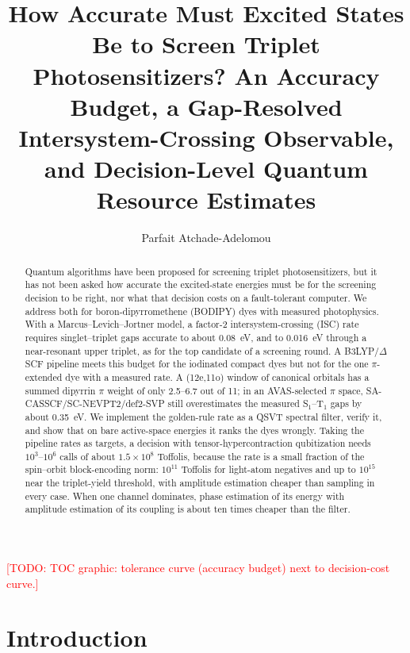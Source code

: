 \documentclass[journal=jctcce,manuscript=article,layout=twocolumn]{achemso}
\author{Parfait Atchade-Adelomou}
\affiliation[MIT Media Lab]{City Science, MIT Media Lab, Massachusetts Institute of Technology,
  75 Amherst St, Cambridge, MA 02139, USA}
\title[Accuracy budget and quantum cost of photosensitizer screening]
{How Accurate Must Excited States Be to Screen Triplet Photosensitizers? An Accuracy Budget, a
 Gap-Resolved Intersystem-Crossing Observable, and Decision-Level Quantum Resource Estimates}
\newcommand{\todo}[1]{\textcolor{red}{[TODO: #1]}}
\begin{document}
\begin{tocentry}
\todo{TOC graphic: tolerance curve (accuracy budget) next to decision-cost curve.}
\end{tocentry}

\begin{abstract}
Quantum algorithms have been proposed for screening triplet photosensitizers, but it has not been
asked how accurate the excited-state energies must be for the screening decision to be right, nor what
that decision costs on a fault-tolerant computer. We address both for boron-dipyrromethene (BODIPY)
dyes with measured photophysics. With a Marcus--Levich--Jortner model, a factor-2 intersystem-crossing
(ISC) rate requires singlet--triplet gaps accurate to about 0.08~eV, and to 0.016~eV through a
near-resonant upper triplet, as for the top candidate of a screening round. A B3LYP/$\Delta$SCF pipeline
meets this budget for the iodinated compact dyes but not for the one $\pi$-extended dye with a measured
rate. A (12e,11o) window of canonical orbitals has a summed dipyrrin $\pi$ weight of only 2.5--6.7 out of
11; in an AVAS-selected $\pi$ space, SA-CASSCF/SC-NEVPT2/def2-SVP still overestimates the measured
S$_1$--T$_1$ gaps by about 0.35~eV. We implement the golden-rule rate as a QSVT spectral filter, verify it,
and show that on bare active-space energies it ranks the dyes wrongly. Taking the pipeline rates as
targets, a decision with tensor-hypercontraction qubitization needs $10^{3}$--$10^{6}$ calls of about
$1.5\times10^{8}$ Toffolis, because the rate is a small fraction of the spin--orbit block-encoding norm:
$10^{11}$ Toffolis for light-atom negatives and up to $10^{15}$ near the triplet-yield threshold, with
amplitude estimation cheaper than sampling in every case. When one channel dominates, phase estimation
of its energy with amplitude estimation of its coupling is about ten times cheaper than the filter.
\end{abstract}

\section{Introduction}
\end{document}
